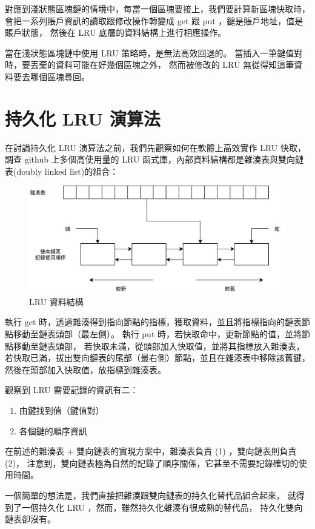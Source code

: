 對應到淺狀態區塊鏈的情境中，每當一個區塊要接上，我們要計算新區塊快取時，
會把一系列賬戶資訊的讀取跟修改操作轉變成 get 跟 put ，鍵是賬戶地址，值是賬戶狀態，
然後在 LRU 底層的資料結構上進行相應操作。

當在淺狀態區塊鏈中使用 LRU 策略時，是無法高效回退的。
當插入一筆鍵值對時，要丟棄的資料可能在好幾個區塊之外，
然而被修改的 LRU 無從得知這筆資料要去哪個區塊尋回。

\section{持久化 LRU 演算法}
在討論持久化 LRU 演算法之前，我們先觀察如何在軟體上高效實作 LRU 快取，
調查 github 上多個高使用量的 LRU 函式庫，內部資料結構都是雜湊表與雙向鏈表(doubly linked list)的組合：

\begin{figure}[h]
\includegraphics[width=\textwidth]{LRU實作}
\caption{LRU 資料結構}
\end{figure}


執行 get 時，透過雜湊得到指向節點的指標，獲取資料，並且將指標指向的鏈表節點移動至鏈表頭部（最左側）。
執行 put 時，若快取命中，更新節點的值，並將節點移動至鏈表頭部，
若快取未滿，從頭部加入快取值，並將其指標放入雜湊表，
若快取已滿，拔出雙向鏈表的尾部（最右側）節點，並且在雜湊表中移除該舊鍵，
然後在頭部加入快取值，放指標到雜湊表。

觀察到 LRU 需要記錄的資訊有二：

\begin{enumerate}
  \item 由鍵找到值（鍵值對）
  \item 各個鍵的順序資訊
\end{enumerate}

在前述的雜湊表 + 雙向鏈表的實現方案中，雜湊表負責 (1) ，雙向鏈表則負責 (2)，
注意到，雙向鏈表極為自然的記錄了順序關係，它甚至不需要記錄確切的使用時間。

一個簡單的想法是，我們直接把雜湊跟雙向鏈表的持久化替代品組合起來，
就得到了一個持久化 LRU ，然而，雖然持久化雜湊有很成熟的替代品，
持久化雙向鏈表卻沒有。


